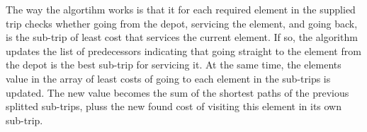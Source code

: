 

The way the algortihm works is that it for each required element in the supplied trip checks whether going from the depot, servicing the element, and going back, is the sub-trip of least cost that services the current element. If so, the algorithm updates the list of predecessors indicating that going straight to the element from the depot is the best sub-trip for servicing it. At the same time, the elements value in the array of least costs of going to each element in the sub-trips is updated. The new value becomes the sum of the shortest paths of the previous splitted sub-trips, pluss the new found cost of visiting this element in its own sub-trip.

